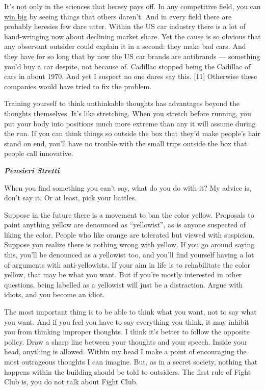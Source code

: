 It's not only in the sciences that heresy pays off. In any competitive
field, you can \href{avg.html}{win big} by seeing things that others
daren't. And in every field there are probably heresies few dare utter.
Within the US car industry there is a lot of hand-wringing now about
declining market share. Yet the cause is so obvious that any observant
outsider could explain it in a second: they make bad cars. And they have
for so long that by now the US car brands are antibrands --- something
you'd buy a car despite, not because of. Cadillac stopped being the
Cadillac of cars in about 1970. And yet I suspect no one dares say this.
{[}11{]} Otherwise these companies would have tried to fix the problem.

Training yourself to think unthinkable thoughts has advantages beyond
the thoughts themselves. It's like stretching. When you stretch before
running, you put your body into positions much more extreme than any it
will assume during the run. If you can think things so outside the box
that they'd make people's hair stand on end, you'll have no trouble with
the small trips outside the box that people call innovative.

\textbf{\emph{Pensieri Stretti}}

When you find something you can't say, what do you do with it? My advice
is, don't say it. Or at least, pick your battles.

Suppose in the future there is a movement to ban the color yellow.
Proposals to paint anything yellow are denounced as ``yellowist'', as is
anyone suspected of liking the color. People who like orange are
tolerated but viewed with suspicion. Suppose you realize there is
nothing wrong with yellow. If you go around saying this, you'll be
denounced as a yellowist too, and you'll find yourself having a lot of
arguments with anti-yellowists. If your aim in life is to rehabilitate
the color yellow, that may be what you want. But if you're mostly
interested in other questions, being labelled as a yellowist will just
be a distraction. Argue with idiots, and you become an idiot.

The most important thing is to be able to think what you want, not to
say what you want. And if you feel you have to say everything you think,
it may inhibit you from thinking improper thoughts. I think it's better
to follow the opposite policy. Draw a sharp line between your thoughts
and your speech. Inside your head, anything is allowed. Within my head I
make a point of encouraging the most outrageous thoughts I can imagine.
But, as in a secret society, nothing that happens within the building
should be told to outsiders. The first rule of Fight Club is, you do not
talk about Fight Club.

